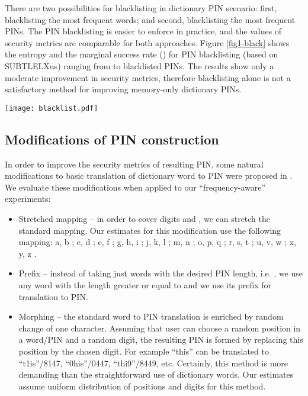 \documentclass[a4paper, 11pt]{article}
\begin{document}
{There are two possibilities for blacklisting in dictionary PIN scenario: first, blacklisting the most frequent 
words; and second, blacklisting the most frequent PINs. The PIN blacklisting is easier to enforce in practice,
and the values of security metrics are comparable for both approaches. Figure \ref{fig1-black} shows the entropy 
and the marginal success rate () for PIN blacklisting (based on SUBTLELXus) ranging from  to 
blacklisted PINs. The results show only a moderate improvement in security metrics, therefore blacklisting alone
is not a satisfactory method for improving memory-only dictionary PINs.

\begin{figure*}[h]\centering
\begin{center}\texttt{[image: blacklist.pdf]}\end{center}
\caption{The effect of PIN blacklisting on entropy and marginal success rate}\label{fig1-black}
\end{figure*}


\subsection{Modifications of PIN construction}

In order to improve the security metrics of resulting PIN, some natural modifications to basic translation
of dictionary word to PIN were proposed in \cite{SS13}. We evaluate these modifications when applied 
to our ``frequency-aware'' experiments:

\begin{itemize}
\renewcommand{\labelitemi}{}
\item Stretched mapping -- in order to cover digits  and , we can stretch the standard mapping. 
  Our estimates for this modification use the following mapping: a, b ; c, d  ;
  e, f  ; g, h, i  ; j, k, l  ; m, n  ; o, p, q  ;
  r, s, t ; u, v, w ; x, y, z .
\item Prefix -- instead of taking just words with the desired PIN length, i.e. , we use any word with the
  length greater or equal to  and we use its prefix for translation to PIN.
\item Morphing -- the standard word to PIN translation is enriched by random change of one character.
  Assuming that user can choose a random position in a word/PIN and a random digit, the resulting PIN
  is formed by replacing this position by the chosen digit. For example ``this'' can be translated to
  ``t1is''/8147, ``0his''/0447, ``thi9''/8449, etc. Certainly, this method is more demanding than the
  straightforward use of dictionary words. Our estimates assume uniform distribution of positions and
  digits for this method.
\end{itemize}

}
\end{document}
